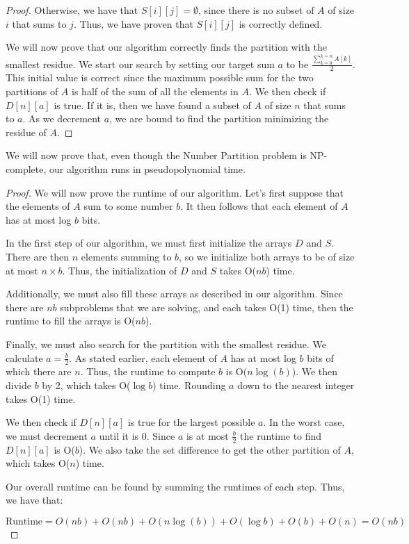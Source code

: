 \documentclass[11pt]{article}
\begin{document}
\begin{proof}
    Otherwise, we have that $S[i][j] = \emptyset$, since there is no subset of $A$ of size $i$ that sums to $j$.
    Thus, we have proven that $S[i][j]$ is correctly defined.

    We will now prove that our algorithm correctly finds the partition with the 
    smallest residue. We start our search by setting our target sum $a$ to be
    $\frac{\sum_{k=0}^{k=n} A[k]}{2}$. This initial value is correct since the  
    maximum possible sum for the two partitions of $A$ is half of the sum of all the
    elements in $A$. We then check if $D[n][a]$ is true. If it is, then we have
    found a subset of $A$ of size $n$ that sums to $a$. As we decrement $a$, we 
    are bound to find the partition minimizing the residue of $A$.

\end{proof}

We will now prove that, even though the Number Partition problem is NP-complete,
our algorithm runs in pseudopolynomial time.

\begin{proof}
    We will now prove the runtime of our algorithm. Let's first suppose that the 
    elements of $A$ sum to some number $b$. It then follows that each element of 
    $A$ has at most log $b$ bits. 

    In the first step of our algorithm, we must first initialize the arrays $D$ and 
    $S$. There are then $n$ elements summing to $b$, so we initialize both arrays
    to be of size at most $n \times b$. Thus, the initialization of $D$ and $S$ takes
    O($nb$) time.

    Additionally, we must also fill these arrays as described in our algorithm. Since
    there are $nb$ subproblems that we are solving, and each takes O(1) time, then 
    the runtime to fill the arrays is O($nb$).

    Finally, we must also search for the partition with the smallest residue. We 
    calculate $a = \frac{b}{2}$. As stated earlier, each element of $A$ has at most
    log $b$ bits of which there are $n$. Thus, the runtime to compute $b$ is 
    O($n \log(b)$). We then divide $b$ by 2, which takes O($\log b$) time. Rounding 
    $a$ down to the nearest integer takes O(1) time. 

    We then check if $D[n][a]$ is true for the largest possible $a$. In the worst 
    case, we must decrement $a$ until it is 0. Since $a$ is at most $\frac{b}{2}$ 
    the runtime to find $D[n][a]$ is O($b$). We also take the set difference to 
    get the other partition of $A$, which takes O($n$) time. 

    Our overall runtime can be found by summing the runtimes of each step. Thus,
    we have that:

    \begin{equation*}
        \text{Runtime} = O(nb) + O(nb) + O(n \log(b)) + O(\log b) + O(b) + O(n) = O(nb)
    \end{equation*}

\end{proof}
\end{document}
